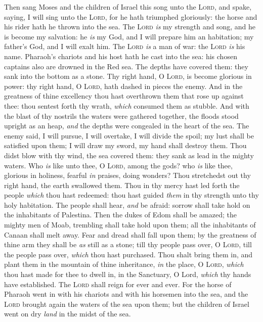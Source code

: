 \documentclass[11pt,letterpaper,oneside]{memoir}
\begin{document}
Then sang Moses and the children of Israel this song unto the
\textsc{Lord}, and spake, saying, I will sing unto the \textsc{Lord},
for he hath triumphed gloriously: the horse and his rider hath he thrown
into the sea. The \textsc{Lord} \emph{is} my strength and song, and he
is become my salvation: he \emph{is} my God, and I will prepare him an
habitation; my father's God, and I will exalt him. The \textsc{Lord}
\emph{is} a man of war: the \textsc{Lord} \emph{is} his name. Pharaoh's
chariots and his host hath he cast into the sea: his chosen captains
also are drowned in the Red sea. The depths have covered them: they sank
into the bottom as a stone. Thy right hand, O \textsc{Lord}, is become
glorious in power: thy right hand, O \textsc{Lord}, hath dashed in
pieces the enemy. And in the greatness of thine excellency thou hast
overthrown them that rose up against thee: thou sentest forth thy wrath,
\emph{which} consumed them as stubble. And with the blast of thy
nostrils the waters were gathered together, the floods stood upright as
an heap, \emph{and} the depths were congealed in the heart of the sea.
The enemy said, I will pursue, I will overtake, I will divide the spoil;
my lust shall be satisfied upon them; I will draw my sword, my hand
shall destroy them. Thou didst blow with thy wind, the sea covered them:
they sank as lead in the mighty waters. Who \emph{is} like unto thee, O
\textsc{Lord}, among the gods? who \emph{is} like thee, glorious in
holiness, fearful \emph{in} praises, doing wonders? Thou stretchedst out
thy right hand, the earth swallowed them. Thou in thy mercy hast led
forth the people \emph{which} thou hast redeemed: thou hast guided
\emph{them} in thy strength unto thy holy habitation. The people shall
hear, \emph{and} be afraid: sorrow shall take hold on the inhabitants of
Palestina. Then the dukes of Edom shall be amazed; the mighty men of
Moab, trembling shall take hold upon them; all the inhabitants of Canaan
shall melt away. Fear and dread shall fall upon them; by the greatness
of thine arm they shall be \emph{as} still as a stone; till thy people
pass over, O \textsc{Lord}, till the people pass over, \emph{which} thou
hast purchased. Thou shalt bring them in, and plant them in the mountain
of thine inheritance, \emph{in} the place, O \textsc{Lord}, \emph{which}
thou hast made for thee to dwell in, in the Sanctuary, O Lord,
\emph{which} thy hands have established. The \textsc{Lord} shall reign
for ever and ever. For the horse of Pharaoh went in with his chariots
and with his horsemen into the sea, and the \textsc{Lord} brought again
the waters of the sea upon them; but the children of Israel went on dry
\emph{land} in the midst of the sea.
\end{document}
